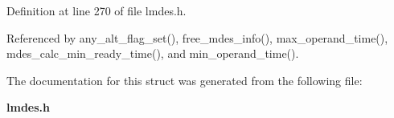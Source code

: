 Definition at line 270 of file lmdes.h.

Referenced by any\_\-alt\_\-flag\_\-set(), free\_\-mdes\_\-info(), max\_\-operand\_\-time(), mdes\_\-calc\_\-min\_\-ready\_\-time(), and min\_\-operand\_\-time().

The documentation for this struct was generated from the following file:\begin{CompactItemize}
\item 
\bf{lmdes.h}\end{CompactItemize}
